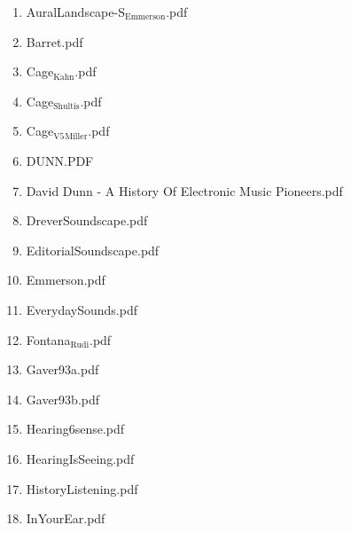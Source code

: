 \documentclass[11pt]{article}
\begin{document}
\begin{enumerate}
\begin{enumerate}
\begin{enumerate}
\item AuralLandscape-S$_{\text{Emmerson}}$.pdf
\label{sec-1-1-1-1-11-19-20-20-2-2}

\item Barret.pdf
\label{sec-1-1-1-1-11-19-20-20-2-3}

\item Cage$_{\text{Kahn}}$.pdf
\label{sec-1-1-1-1-11-19-20-20-2-4}

\item Cage$_{\text{Shultis}}$.pdf
\label{sec-1-1-1-1-11-19-20-20-2-5}

\item Cage$_{\text{V5}}$$_{\text{Miller}}$.pdf
\label{sec-1-1-1-1-11-19-20-20-2-6}

\item DUNN.PDF
\label{sec-1-1-1-1-11-19-20-20-2-7}

\item David Dunn - A History Of Electronic Music Pioneers.pdf
\label{sec-1-1-1-1-11-19-20-20-2-8}

\item DreverSoundscape.pdf
\label{sec-1-1-1-1-11-19-20-20-2-9}

\item EditorialSoundscape.pdf
\label{sec-1-1-1-1-11-19-20-20-2-10}

\item Emmerson.pdf
\label{sec-1-1-1-1-11-19-20-20-2-11}

\item EverydaySounds.pdf
\label{sec-1-1-1-1-11-19-20-20-2-12}

\item Fontana$_{\text{Rudi}}$.pdf
\label{sec-1-1-1-1-11-19-20-20-2-13}

\item Gaver93a.pdf
\label{sec-1-1-1-1-11-19-20-20-2-14}

\item Gaver93b.pdf
\label{sec-1-1-1-1-11-19-20-20-2-15}

\item Hearing6sense.pdf
\label{sec-1-1-1-1-11-19-20-20-2-16}

\item HearingIsSeeing.pdf
\label{sec-1-1-1-1-11-19-20-20-2-17}

\item HistoryListening.pdf
\label{sec-1-1-1-1-11-19-20-20-2-18}

\item InYourEar.pdf
\label{sec-1-1-1-1-11-19-20-20-2-19}


\end{enumerate}
\end{enumerate}
\end{enumerate}
\end{document}
